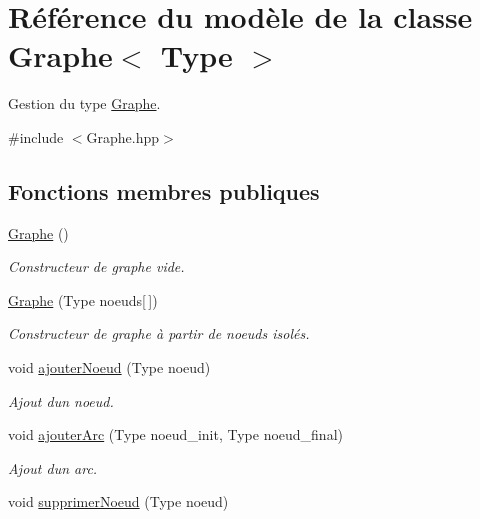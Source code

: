 \hypertarget{class_graphe}{}\section{Référence du modèle de la classe Graphe$<$ Type $>$}
\label{class_graphe}


Gestion du type \hyperlink{class_graphe}{Graphe}.  




{\ttfamily \#include $<$Graphe.\+hpp$>$}

\subsection*{Fonctions membres publiques}
\begin{DoxyCompactItemize}
\item 
\mbox{\label{class_graphe_ac6269bd27d5bd9386348e34879619d2f}} 
\hyperlink{class_graphe_ac6269bd27d5bd9386348e34879619d2f}{Graphe} ()
\begin{DoxyCompactList}\small\item\em Constructeur de graphe vide. \end{DoxyCompactList}\item 
\mbox{\label{class_graphe_a4769b44ffb23da74a1b413857966c157}} 
\hyperlink{class_graphe_a4769b44ffb23da74a1b413857966c157}{Graphe} (Type noeuds\mbox{[}$\,$\mbox{]})
\begin{DoxyCompactList}\small\item\em Constructeur de graphe à partir de noeuds isolés. \end{DoxyCompactList}\item 
void \hyperlink{class_graphe_a555829daa877e49cdb4e9555e559650c}{ajouter\+Noeud} (Type noeud)
\begin{DoxyCompactList}\small\item\em Ajout d\textquotesingle{}un noeud. \end{DoxyCompactList}\item 
void \hyperlink{class_graphe_a690a652df5be597b9045d2036bad11ed}{ajouter\+Arc} (Type noeud\+\_\+init, Type noeud\+\_\+final)
\begin{DoxyCompactList}\small\item\em Ajout d\textquotesingle{}un arc. \end{DoxyCompactList}\item 
void \hyperlink{class_graphe_a5887c7cd72bcf4b5f8c169a22b5180f1}{supprimer\+Noeud} (Type noeud)

\end{DoxyCompactItemize}
